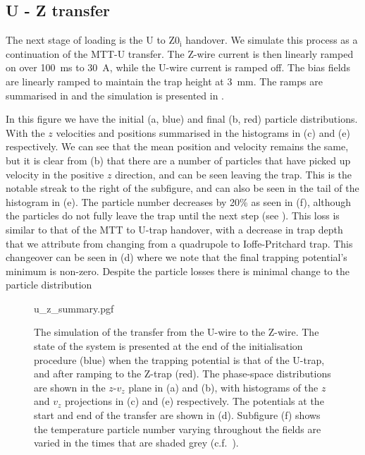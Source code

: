 \subsection{U - Z transfer}
\label{sim:sim:U_to_Z0i}

The next stage of loading is the U to $\mathrm{Z0_i}$ handover. We simulate
this process as a continuation of the MTT-U transfer.  The Z-wire current is
then linearly ramped on over \SI{100}{\milli\second} to \SI{30}{\ampere}, while
the U-wire current is ramped off. The
bias fields are linearly ramped to maintain the trap height at
\SI{3}{\milli\meter}. The ramps are summarised in 
and the simulation is presented in .

In this figure we have the initial (a, blue) and final (b, red) particle
distributions.  With the $z$ velocities and positions summarised in the
histograms in (c) and (e) respectively. We can see that the mean position and
velocity remains the same, but it is clear from (b) that there are a number of
particles that have picked up velocity in the positive $z$ direction, and can
be seen leaving the trap. This is the notable streak to the right of the
subfigure, and can also be seen in the tail of the histogram in (e). The
particle number decreases by 20\% as seen in (f), although the particles do not
fully leave the trap until the next step (see
). This loss is similar to that of the MTT to
U-trap handover, with a decrease in trap depth that we attribute from changing
from a quadrupole to Ioffe-Pritchard trap. This changeover can be seen in (d)
where we note that the final trapping potential's minimum is non-zero. Despite
the particle losses there is minimal change to the particle distribution

\begin{figure}[p]
\centering
  {u_z_summary.pgf}
  \caption{
    The simulation of the transfer from the U-wire to the Z-wire. The state of
    the system is presented at the end of the initialisation procedure (blue)
    when the trapping potential is that of the U-trap, and after ramping to the
    Z-trap (red). The phase-space distributions are shown in the $z$-$v_z$
    plane in (a) and (b), with histograms of the $z$ and $v_z$ projections in
    (c) and (e) respectively. The potentials at the start and end of the
    transfer are shown in (d). Subfigure (f) shows the temperature particle
    number varying throughout the fields are varied in the times that are
    shaded grey (c.f.~).
  }
  \label{sim:fig:uzsim}
\end{figure}

